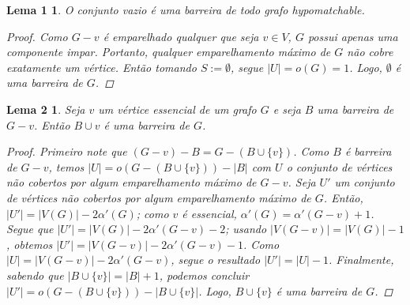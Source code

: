 \documentclass[a4paper,12pt]{article}
\newtheorem*{1}{Lema 1}
\newtheorem*{2}{Lema 2}
\begin{document}
\begin{1}

O conjunto vazio é uma barreira de todo grafo hypomatchable.

\begin{proof}

Como $G-v$ é emparelhado qualquer que seja $v \in V$, $G$ possui apenas uma componente impar. Portanto, qualquer emparelhamento máximo de $G$ não cobre exatamente um vértice. Então tomando $S := \emptyset$, segue $|U| = o(G) = 1$. Logo, $\emptyset$ é uma barreira de $G$.

\end{proof}

\end{1}

\begin{2}

Seja $v$ um vértice essencial de um grafo $G$ e seja $B$ uma barreira de $G-v$. Então $B \cup {v}$ é uma barreira de $G$.

\begin{proof}

Primeiro note que $(G-v)-B = G - (B\cup\{v\})$. Como $B$ é barreira de $G-v$, temos $|U| = o(G-(B \cup \{v\}))-|B|$ com $U$ o conjunto de vértices não cobertos por algum emparelhamento máximo de $G-v$. Seja $U'$ um conjunto de vértices não cobertos por algum emparelhamento máximo de $G$. Então, $|U'| = |V(G)| - 2\alpha'(G)$; como $v$ é essencial, $\alpha'(G) = \alpha'(G-v) + 1$. Segue que $|U'| = |V(G)| - 2\alpha'(G-v) - 2$; usando $|V(G-v)| = |V(G)| - 1$, obtemos $|U'| = |V(G-v)| - 2\alpha'(G-v) - 1$. Como $|U| = |V(G-v)| - 2\alpha'(G-v)$, segue o resultado $|U'| = |U| - 1$. Finalmente, sabendo que $|B \cup \{v\}| = |B| + 1$, podemos concluir $|U'| = o(G - (B \cup \{v\})) - |B \cup \{v\}|$. Logo, $B \cup \{v\}$ é uma barreira de $G$.

\end{proof}

\end{2}
\end{document}
